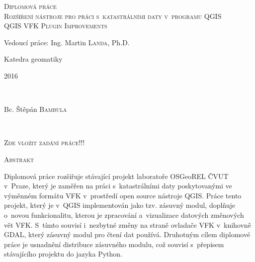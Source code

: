 \documentclass[a4paper,12pt,oneside]{book}
\begin{document}
\begin{titlepage}
\textsc{\Large Diplomová práce}\\
\vfill
\textsc{\LARGE  Rozšíření nástroje pro práci s~katastrálními daty v~programu QGIS}\\[0.5cm] %

\textsc{\Large QGIS VFK Plugin Improvements}
 
 
 \vfill
\large Vedoucí práce: Ing. Martin \textsc{Landa}, Ph.D.

Katedra geomatiky
 
\vfill
\begin{minipage}{0.4\textwidth}
\begin{flushleft} 
\large 2016	%
\end{flushleft}
\end{minipage}
~
\begin{minipage}{0.4\textwidth}
\begin{flushright} 
\large Bc. Štěpán \textsc{Bambula} \\ %
\end{flushright}
\end{minipage}\\[1cm]
 
\end{titlepage}

\clearpage
\pagestyle{empty}

\vspace*{\fill}
\begin{center}
\textsc{\Large Zde vložit zadání práce!!!}
\end{center}

\vspace*{\fill}

\clearpage

\hfill

\noindent
\textsc{\Large Abstrakt}

\vspace{12pt}

Diplomová práce rozšiřuje stávající projekt laboratoře OSGeoREL ČVUT v~Pra\-ze, který je zaměřen na práci s~katastrálními daty poskytovanými ve výměnném formátu VFK v~prostředí open source nástroje QGIS. Práce tento projekt, který je v~QGIS implementován jako tzv. zásuvný modul, doplňuje o~novou funkcionalitu, kterou je zpracování a~vizualizace datových změnových vět VFK. S~tímto souvisí i~nezbytné změny na straně ovladače VFK v~knihovně GDAL, který zásuvný modul pro čtení dat používá. Druhotným cílem diplomové práce je usnadnění distribuce zásuvného modulu, což souvisí s~přepisem stávajícího projektu do jazyka Python.
\end{document}
